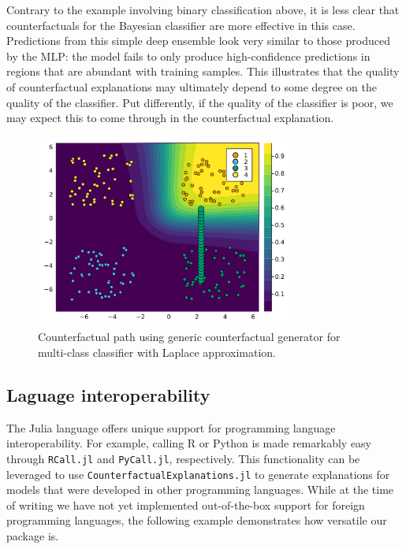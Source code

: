 \documentclass{juliacon}
\begin{document}
Contrary to the example involving binary classification above, it is
less clear that counterfactuals for the Bayesian classifier are more
effective in this case. Predictions from this simple deep ensemble look
very similar to those produced by the MLP: the model fails to only
produce high-confidence predictions in regions that are abundant with
training samples. This illustrates that the quality of counterfactual
explanations may ultimately depend to some degree on the quality of the
classifier. Put differently, if the quality of the classifier is poor,
we may expect this to come through in the counterfactual explanation.

\begin{figure}

{\centering \includegraphics[width=3.33333in,height=2.5in]{www/ce_multi_ensemble.png}

}

\caption{\label{fig-multi-ensemble}Counterfactual path using generic
counterfactual generator for multi-class classifier with Laplace
approximation.}

\end{figure}

\hypertarget{laguage-interoperability}{%
\subsection{Laguage interoperability}\label{laguage-interoperability}}

The Julia language offers unique support for programming language
interoperability. For example, calling R or Python is made remarkably
easy through \texttt{RCall.jl} and \texttt{PyCall.jl}, respectively.
This functionality can be leveraged to use
\texttt{CounterfactualExplanations.jl} to generate explanations for
models that were developed in other programming languages. While at the
time of writing we have not yet implemented out-of-the-box support for
foreign programming languages, the following example demonstrates how
versatile our package is.
\end{document}
